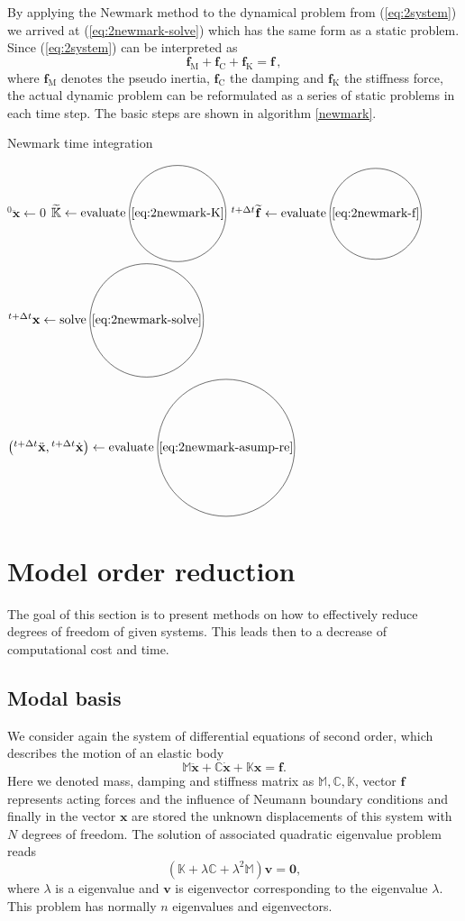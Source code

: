 \documentclass[conference]{journal}
\newcommand*\circled[1]{\tikz[baseline=(char.base)]{
   \node[shape=circle,draw,inner sep=1pt] (char) {#1};}}
\newcommand{\bb}[1]{\mathbb{#1}}
\newcommand{\B}[1]{\mathbf{#1}}
\newcommand{\Bx}{\B{x}}
\newcommand{\Bv}{\B{v}}
\newcommand{\xtt}{{}^{t+\Delta t}\Bx}
\newcommand{\vtt}{{}^{t+\Delta t}\dot{\Bx}}
\newcommand{\att}{{}^{t+\Delta t}\ddot{\Bx}}
\newcommand{\M}{\bb{M}}
\newcommand{\C}{\bb{C}}
\newcommand{\K}{\bb{K}}
\begin{document}
	By applying the Newmark method to the dynamical problem from (\ref{eq:2system}) we arrived at (\ref{eq:2newmark-solve}) which has the same form as a static problem. Since (\ref{eq:2system}) can be interpreted as
	\begin{equation} \label{eq:2system-forces}
	\B{f}_\mathrm{M} + \B{f}_\mathrm{C} + \B{f}_\mathrm{K} = \B{f}\,,
	\end{equation}
	where $\B{f}_\mathrm{M}$ denotes the pseudo inertia, $\B{f}_\mathrm{C}$ the damping and $\B{f}_\mathrm{K}$ the stiffness force, the actual dynamic problem can be reformulated as a series of static problems in each time step. The basic steps are shown in algorithm \ref{newmark}.

	\begin{algorithm}
	\caption{Newmark time integration}\label{newmark}
	\begin{algorithmic}[1]
	\Procedure{Newmark}{$\M,\, \C,\, \K,\, \B{f}(t),\, \Delta t,\, t_\mathrm{end},\, {}^{0}\Bx,\, {}^{0}\dot{\Bx}$}
	\State ${}^{0}\ddot{\Bx} \gets 0$
	\State $\widetilde{\K} \gets \mathrm{evaluate} \; \circled{\ref{eq:2newmark-K}}$
		\State ${}^{t+\Delta t}\widetilde{\B{f}} \gets \mathrm{evaluate} \; \circled{\ref{eq:2newmark-f}}$
		\State $\xtt \gets \mathrm{solve} \; \circled{\ref{eq:2newmark-solve}}$
		\State $\left(\att,\vtt\right) \gets \mathrm{evaluate} \; \circled{\ref{eq:2newmark-asump-re}}$
	\EndFor
	\EndProcedure
	\end{algorithmic}
	\end{algorithm}

	
	
	\section{Model order reduction}
	The goal of this section is to present methods on how to effectively reduce degrees of freedom of given systems. This leads then to a decrease of computational cost and time.
	
	\subsection{Modal basis}
	We consider again the system of differential equations of second order, which describes the motion of an elastic body
	\begin{equation} \label{eq:3system}
	\M \ddot{\Bx} + \C \dot{\Bx} + \K \Bx = \B{f}.
	\end{equation}
	Here we denoted mass, damping and stiffness matrix as $\M, \C, \K$, vector $\B{f}$ represents acting forces and the influence of Neumann boundary conditions and finally in the vector $\Bx$ are stored the unknown displacements of this system with $N$ degrees of freedom. The solution of associated quadratic eigenvalue problem reads
	\begin{equation} \label{eq:3eigs}
	(\K + \lambda \C + \lambda^2 \M) \Bv = \B{0},
	\end{equation}
	where $\lambda$ is a eigenvalue and $\B{v}$ is eigenvector corresponding to the eigenvalue $\lambda$. This problem has normally $n$ eigenvalues and eigenvectors. 
	
\end{document}
